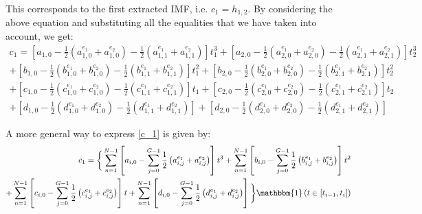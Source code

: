 This corresponds to the first extracted IMF, i.e. $c_1 = h_{1,2}$. By considering the above equation and substituting all the equalities that we have taken into account, we get:
\begin{equation}
\label{c_1}
\begin{split}
c_1 = \left[ a_{1,0} - \frac{1}{2} \left(a_{1,0}^{e_1} + a_{1,0}^{e_2} \right) - \frac{1}{2} \left(a_{1,1}^{e_1} + a_{1,1}^{e_2} \right)  \right] t_1^3 + \left[ a_{2,0} - \frac{1}{2} \left(a_{2,0}^{e_1} + a_{2,0}^{e_2} \right) - \frac{1}{2} \left(a_{2,1}^{e_1} + a_{2,1}^{e_2} \right)  \right] t_2^3 \\
+ \left[ b_{1,0} - \frac{1}{2} \left(b_{1,0}^{e_1} + b_{1,0}^{e_2} \right) - \frac{1}{2} \left(b_{1,1}^{e_1} + b_{1,1}^{e_2} \right)  \right] t_1^2 + \left[ b_{2,0} - \frac{1}{2} \left(b_{2,0}^{e_1} + b_{2,0}^{e_2} \right) - \frac{1}{2} \left(b_{2,1}^{e_1} + b_{2,1}^{e_2} \right)  \right] t_2^2 \\
+ \left[ c_{1,0} - \frac{1}{2} \left(c_{1,0}^{e_1} + c_{1,0}^{e_2} \right) - \frac{1}{2} \left(c_{1,1}^{e_1} + c_{1,1}^{e_2} \right)  \right] t_1 + \left[ c_{2,0} - \frac{1}{2} \left(c_{2,0}^{e_1} + c_{2,0}^{e_2} \right) - \frac{1}{2} \left(c_{2,1}^{e_1} + c_{2,1}^{e_2} \right)  \right] t_2 \\
+ \left[ d_{1,0} - \frac{1}{2} \left(d_{1,0}^{e_1} + d_{1,0}^{e_2} \right) - \frac{1}{2} \left(d_{1,1}^{e_1} + d_{1,1}^{e_2} \right)  \right] + \left[ d_{2,0} - \frac{1}{2} \left(d_{2,0}^{e_1} + d_{2,0}^{e_2} \right) - \frac{1}{2} \left(d_{2,1}^{e_1} + d_{2,1}^{e_2} \right)  \right] 
\end{split}
\end{equation}

A more general way to express \ref{c_1} is given by:
\begin{equation}
\begin{split}
c_1 = \bigg\{ \sum_{n=1}^{N-1} \left[ a_{i,0} - \sum_{j=0}^{G-1} \frac{1}{2} \left( a_{i,j}^{e_1} + a_{i,j}^{e_2} \right) \right]t^3 + \sum_{n=1}^{N-1} \left[ b_{i,0} - \sum_{j=0}^{G-1} \frac{1}{2} \left( b_{i,j}^{e_1} + b_{i,j}^{e_2} \right) \right] t^2 \\
+ \sum_{n=1}^{N-1} \left[ c_{i,0} - \sum_{j=0}^{G-1} \frac{1}{2} \left( c_{i,j}^{e_1} + c_{i,j}^{e_2} \right) \right] t  + \sum_{n=1}^{N-1} \left[ d_{i,0} - \sum_{j=0}^{G-1} \frac{1}{2} \left( d_{i,j}^{e_1} + d_{i,j}^{e_2} \right) \right] \bigg\} \mathbbm{1} \left( t \in \left[ t_{i-1}, t_i \right] \right)
\end{split}
\end{equation}

